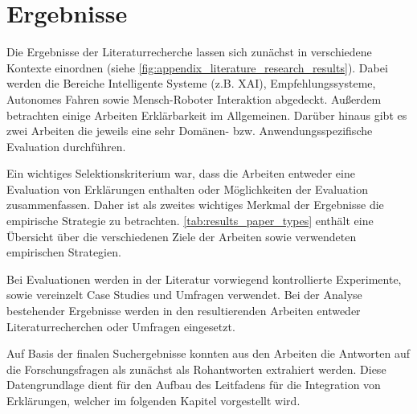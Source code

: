\newpage

\section{Ergebnisse}

Die Ergebnisse der Literaturrecherche lassen sich zunächst in verschiedene Kontexte einordnen (siehe \autoref{fig:appendix_literature_research_results}). Dabei werden die Bereiche Intelligente Systeme (z.B. XAI), Empfehlungssysteme, Autonomes Fahren sowie Mensch-Roboter Interaktion abgedeckt. Außerdem betrachten einige Arbeiten Erklärbarkeit im Allgemeinen. Darüber hinaus gibt es zwei Arbeiten die jeweils eine sehr Domänen- bzw. Anwendungsspezifische Evaluation durchführen.

Ein wichtiges Selektionskriterium war, dass die Arbeiten entweder eine Evaluation von Erklärungen enthalten oder Möglichkeiten der Evaluation zusammenfassen. Daher ist als zweites wichtiges Merkmal der Ergebnisse die empirische Strategie zu betrachten. \autoref{tab:results_paper_types} enthält eine Übersicht über die verschiedenen Ziele der Arbeiten sowie verwendeten empirischen Strategien.

Bei Evaluationen werden in der Literatur vorwiegend kontrollierte Experimente, sowie vereinzelt Case Studies und Umfragen verwendet. Bei der Analyse bestehender Ergebnisse werden in den resultierenden Arbeiten entweder Literaturrecherchen oder Umfragen eingesetzt.

Auf Basis der finalen Suchergebnisse konnten aus den Arbeiten die Antworten auf die Forschungsfragen als zunächst als Rohantworten extrahiert werden. Diese Datengrundlage dient für den Aufbau des Leitfadens für die Integration von Erklärungen, welcher im folgenden Kapitel vorgestellt wird.

